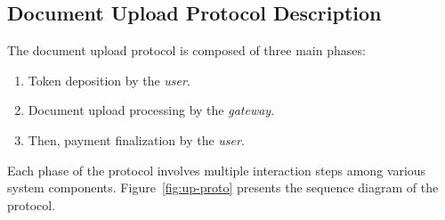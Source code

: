 \subsection{Document Upload Protocol Description}
The document upload protocol is composed of three main phases:
\begin{enumerate}
\item Token deposition by the {\it user}.
\item Document upload processing by the {\it gateway}.
\item Then, payment finalization by the {\it user}.
\end{enumerate}
Each phase of the protocol involves multiple interaction steps among various system components. Figure~\ref{fig:up-proto} presents the sequence diagram of the protocol.
